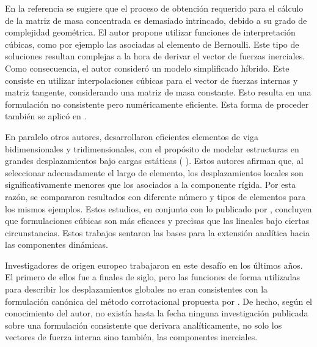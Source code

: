 En la referencia \cite{Crisfield} se sugiere que el proceso de obtención requerido para el cálculo de la matriz de masa concentrada es demasiado intrincado, debido a su grado de complejidad geométrica. El autor propone utilizar funciones de interpretación cúbicas, como por ejemplo las asociadas al elemento de Bernoulli. Este tipo de soluciones resultan complejas a la hora de derivar el vector de fuerzas inerciales. Como consecuencia, el autor consideró un modelo simplificado híbrido. Este consiste en utilizar interpolaciones cúbicas para el vector de fuerzas internas y matriz tangente, considerando una matriz de masa constante. Esto resulta en una formulación no consistente pero numéricamente eficiente.  Esta forma de proceder también se aplicó en \cite{pacoste1997beam}.

En paralelo otros autores, desarrollaron eficientes elementos de viga bidimensionales y tridimensionales, con el propósito de modelar estructuras en grandes desplazamientos bajo cargas estáticas (\cite{Battini2002} \cite{alsafadie2010corotational}).
Estos autores afirman que, al seleccionar adecuadamente el largo de elemento, los desplazamientos locales son significativamente menores que los asociados a la componente rígida. Por esta razón, se compararon resultados con diferente número y tipos de elementos para los mismos ejemplos. Estos estudios, en conjunto con lo publicado por \cite{alsafadie2010corotational}, concluyen que formulaciones cúbicas son más eficaces y precisas que las lineales bajo ciertas circunstancias. Estos trabajos sentaron las bases para la extensión analítica hacia las componentes dinámicas.

Investigadores de origen europeo trabajaron en este desafío en los últimos años. El primero de ellos fue \cite{behdinan1998co} a finales de siglo, pero las funciones de forma utilizadas para describir los desplazamientos globales no eran consistentes con la formulación canónica del método corrotacional propuesta por \textcite{simo1988dynamics}. De hecho, según el conocimiento del autor, no existía hasta la fecha ninguna investigación publicada sobre una formulación consistente que derivara analíticamente, no solo los vectores de fuerza interna sino también, las componentes inerciales.   

